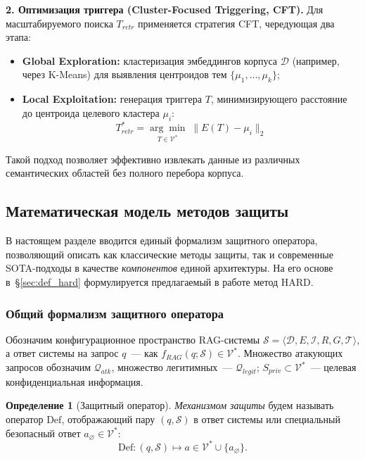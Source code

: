 \documentclass[12pt, a4paper]{article}
\theoremstyle{definition}
\newtheorem{definition}[theorem]{Определение}
\theoremstyle{remark}
\begin{document}
\textbf{2. Оптимизация триггера (Cluster-Focused Triggering, CFT).}
Для масштабируемого поиска $T_{retr}$ применяется стратегия CFT, чередующая два этапа:
\begin{itemize}
    \item \textbf{Global Exploration:} кластеризация эмбеддингов корпуса $\mathcal{D}$ (например, через K-Means) для выявления центроидов тем $\{\mu_1, \dots, \mu_k\}$;
    \item \textbf{Local Exploitation:} генерация триггера $T$, минимизирующего расстояние до центроида целевого кластера $\mu_i$:
    \begin{equation}
        T_{retr}^* = \underset{T \in \mathcal{V}^*}{\arg\min} \; \lVert E(T) - \mu_i \rVert_2
    \end{equation}
\end{itemize}
Такой подход позволяет эффективно извлекать данные из различных семантических областей без полного перебора корпуса.

\subsection{Математическая модель методов защиты}
\label{sec:math_defenses}

В настоящем разделе вводится единый формализм защитного оператора, позволяющий описать как классические методы защиты, так и современные SOTA-подходы в качестве \textit{компонентов} единой архитектуры. На его основе в~\S\ref{sec:def_hard} формулируется предлагаемый в работе метод HARD.

\subsubsection{Общий формализм защитного оператора}
\label{sec:def_general}

Обозначим конфигурационное пространство RAG-системы $\mathcal{S} = \langle \mathcal{D}, E, \mathcal{I}, R, G, \mathcal{T} \rangle$, а ответ системы на запрос $q$~--- как $f_{RAG}(q; \mathcal{S}) \in \mathcal{V}^*$. Множество атакующих запросов обозначим $\mathcal{Q}_{atk}$, множество легитимных~--- $\mathcal{Q}_{legit}$; $S_{priv} \subset \mathcal{V}^*$~--- целевая конфиденциальная информация.

\begin{definition}[Защитный оператор]
\label{def:defense_operator}
\textit{Механизмом защиты} будем называть оператор $\mathrm{Def}$, отображающий пару $(q, \mathcal{S})$ в ответ системы или специальный безопасный ответ $a_\varnothing \in \mathcal{V}^*$:
\begin{equation}
    \mathrm{Def}: (q, \mathcal{S}) \mapsto a \in \mathcal{V}^* \cup \{a_\varnothing\}.
\end{equation}
\end{definition}
\end{document}
